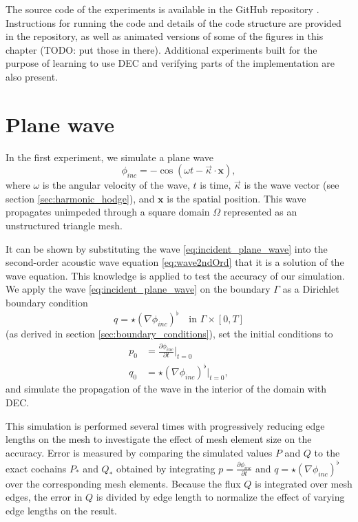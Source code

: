 \documentclass[utf8,english]{gradu3}
\begin{document}
The source code of the experiments is available
in the GitHub repository \parencite{myyra_wavepool_2023}.
Instructions for running the code
and details of the code structure are provided in the repository,
as well as animated versions of some of the figures in this chapter (TODO: put those in there).
Additional experiments built for the purpose of learning to use DEC
and verifying parts of the implementation are also present.


\section{Plane wave}

In the first experiment, we simulate a plane wave
\begin{equation}\label{eq:incident_plane_wave}
  \phi_{inc} = -\cos(\omega t - \vec{\kappa} \cdot \mathbf{x}),
\end{equation}
where $\omega$ is the angular velocity of the wave,
$t$ is time, $\vec{\kappa}$ is the wave vector (see section \ref{sec:harmonic_hodge}),
and $\mathbf{x}$ is the spatial position.
This wave propagates unimpeded through a square domain $\Omega$
represented as an unstructured triangle mesh.

It can be shown by substituting the wave \eqref{eq:incident_plane_wave} into 
the second-order acoustic wave equation \eqref{eq:wave2ndOrd}
that it is a solution of the wave equation.
This knowledge is applied to test the accuracy of our simulation.
We apply the wave \eqref{eq:incident_plane_wave}
on the boundary $\Gamma$ as a Dirichlet boundary condition
\begin{equation}\label{eq:plane_wave_boundary_dirichlet}
  q = \star (\nabla \phi_{inc})^{\flat} \quad \text{in } \Gamma \times [0,T]
\end{equation}
(as derived in section \ref{sec:boundary_conditions}),
set the initial conditions to
\begin{align}
  p_0 &= \frac{\partial \phi_{inc}}{\partial t} \Big|_{t=0} \\
  q_0 &= \star (\nabla \phi_{inc})^{\flat} \Big|_{t=0},
\end{align}
and simulate the propagation of the wave in the interior of the domain with DEC.

This simulation is performed several times with progressively reducing
edge lengths on the mesh to investigate the effect of mesh element size on the accuracy.
Error is measured by comparing the simulated values $P$ and $Q$ to the exact cochains
$P_*$ and $Q_*$ obtained by integrating $p = \frac{\partial \phi_{inc}}{\partial t}$
and $q = \star (\nabla \phi_{inc})^{\flat}$ over the corresponding mesh elements.
Because the flux $Q$ is integrated over mesh edges, the error in $Q$ is divided
by edge length to normalize the effect of varying edge lengths on the result.
\end{document}

